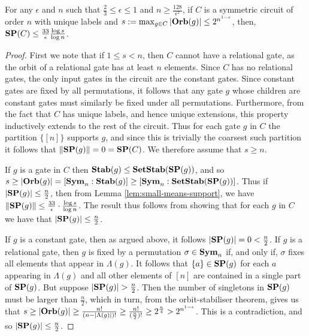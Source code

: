\documentclass[../paper.tex]{subfiles}
\begin{document}
\begin{thm}
  \label{thm:support-thm}
  For any $\epsilon$ and $n$ such that $\frac{2}{3} \leq \epsilon \leq 1$ and $n
  \geq \frac{128}{\epsilon^2}$, if $C$ is a symmetric circuit of order $n$ with
  unique labels and $s := \max_{g \in C} \vert \text{\textbf{Orb}} (g)\vert \leq
  2^{n^{1-\epsilon}}$, then, $\text{\textbf{SP}}(C) \leq \frac{33}{\epsilon}\frac{\log s}{\log
    n}$.
\end{thm}

\begin{proof}
  First we note that if $1 \leq s < n$, then $C$ cannot have a relational gate,
  as the orbit of a relational gate has at least $n$ elements. Since $C$ has no
  relational gates, the only input gates in the circuit are the constant gates.
  Since constant gates are fixed by all permutations, it follows that any gate
  $g$ whose children are constant gates must similarly be fixed under all
  permutations. Furthermore, from the fact that $C$ has unique labels, and hence
  unique extensions, this property inductively extends to the rest of the
  circuit. Thus for each gate $g$ in $C$ the partition $\{[n]\}$ supports $g$,
  and since this is trivially the coarsest such partition it follows that $\|
  \text{\textbf{SP}}(g) \| = 0 = \text{\textbf{SP}}(C)$. We therefore assume that $s \geq n$.

  If $g$ is a gate in $C$ then $\text{\textbf{Stab}} (g) \leq \text{\textbf{SetStab}}(\text{\textbf{SP}}(g))$, and so $s \geq
  \vert \text{\textbf{Orb}}(g) \vert = [\text{\textbf{Sym}}_n : \text{\textbf{Stab}}(g)] \geq [\text{\textbf{Sym}}_n : \text{\textbf{SetStab}}(\text{\textbf{SP}}(g))]$.
  Thus if $\vert \text{\textbf{SP}}(g) \vert \leq \frac{n}{2}$, then from Lemma
  \ref{lem:small-means-support}, we have $\| \text{\textbf{SP}} (g) \| \leq \frac{33}{\epsilon}
  \cdot \frac{\log s} {\log n}$. The result thus follows from showing that for
  each $g$ in $C$ we have that $\vert \text{\textbf{SP}} (g) \vert \leq \frac{n}{2}$.
  
  If $g$ is a constant gate, then as argued above, it follows $\vert \text{\textbf{SP}}(g)
  \vert = 0 < \frac{n}{2}$. If $g$ is a relational gate, then $g$ is fixed by a
  permutation $\sigma \in \text{\textbf{Sym}}_n$ if, and only if, $\sigma$ fixes all elements
  that appear in $\Lambda(g)$. It follows that $\{a\} \in \text{\textbf{SP}}(g)$ for each $a$
  appearing in $\Lambda(g)$ and all other elements of $[n]$ are contained in a
  single part of $\text{\textbf{SP}}(g)$. But suppose $\vert \text{\textbf{SP}}(g) \vert > \frac{n}{2}$. Then
  the number of singletons in $\text{\textbf{SP}}(g)$ must be larger than $\frac{n}{2}$, which
  in turn, from the orbit-stabiliser theorem, gives us that $ s \geq \vert \text{\textbf{Orb}}
  (g) \vert \geq \frac{n!}{(n-\vert \Lambda (g) \vert)!} \geq
  \frac{n!}{{(\frac{n}{2}})!} \geq 2^{\frac{n}{4}} > 2^{n^{1- \epsilon}} $. This
  is a contradiction, and so $\vert \text{\textbf{SP}}(g) \vert \leq \frac{n}{2}$.


\end{proof}
\end{document}
